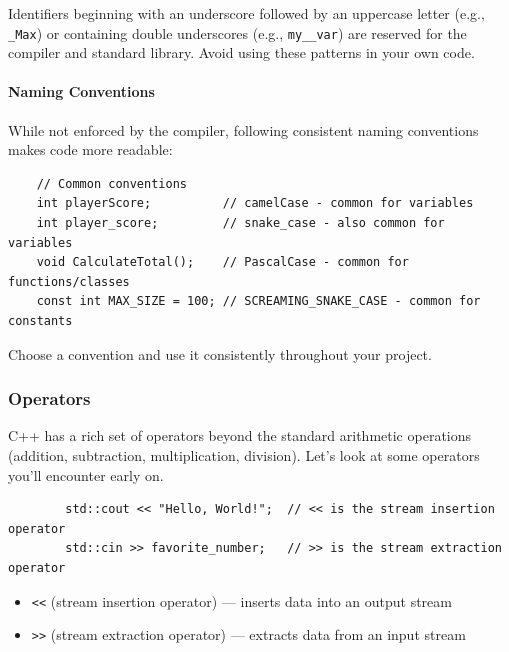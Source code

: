 \begin{remark}
	Identifiers beginning with an underscore followed by an uppercase letter (e.g., \texttt{\_Max}) or containing double underscores (e.g., \texttt{my\_\_var}) are reserved for the compiler and standard library. Avoid using these patterns in your own code.
\end{remark}

\paragraph{Naming Conventions}

While not enforced by the compiler, following consistent naming conventions makes code more readable:

\begin{lstlisting}
	// Common conventions
	int playerScore;          // camelCase - common for variables
	int player_score;         // snake_case - also common for variables
	void CalculateTotal();    // PascalCase - common for functions/classes
	const int MAX_SIZE = 100; // SCREAMING_SNAKE_CASE - common for constants
\end{lstlisting}

Choose a convention and use it consistently throughout your project.

\subsubsection{Operators}

C++ has a rich set of operators beyond the standard arithmetic operations (addition, subtraction, multiplication, division). Let's look at some operators you'll encounter early on.

\begin{example}{\leavevmode}
	
	\begin{lstlisting}
		std::cout << "Hello, World!";  // << is the stream insertion operator
		std::cin >> favorite_number;   // >> is the stream extraction operator
	\end{lstlisting}
	
	\begin{itemize}
		\item \texttt{<<} (stream insertion operator) — inserts data into an output stream
		\item \texttt{>>} (stream extraction operator) — extracts data from an input stream
	\end{itemize}
\end{example}

